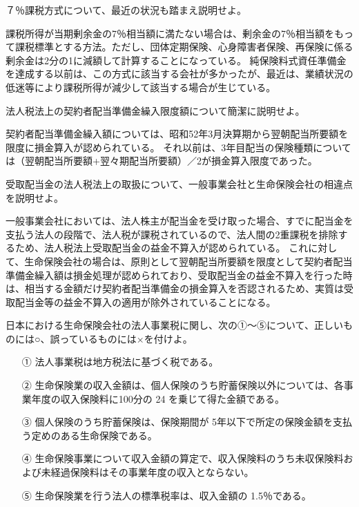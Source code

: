 \documentclass[report,gutter=10mm,fore-edge=10mm,uplatex,dvipdfmx]{jlreq}
\begin{document}
７％課税方式について、最近の状況も踏まえ説明せよ。

課税所得が当期剰余金の7％相当額に満たない場合は、剰余金の7％相当額をもって課税標準とする方法。ただし、団体定期保険、心身障害者保険、再保険に係る剰余金は2分の1に減額して計算することになっている。
純保険料式資任準備金を達成する以前は、この方式に該当する会社が多かったが、最近は、業績状況の低迷等により課税所得が減少して該当する場合が生じている。\strut


法人税法上の契約者配当準備金繰入限度額について簡潔に説明せよ。


契約者配当準備金繰入額については、昭和52年3月決算期から翌朝配当所要額を限度に損金算入が認められている。
それ以前は、3年目配当の保険種類については（翌朝配当所要額+翌々期配当所要額）／2が損金算入限度であった。



受取配当金の法人税法上の取扱について、一般事業会社と生命保険会社の相違点を説明せよ。



一般事業会社においては、法人株主が配当金を受け取った場合、すでに配当金を支払う法人の段階で、法人税が課税されているので、法人間の2重課税を排除するため、法人税法上受取配当金の益金不算入が認められている。
これに対して、生命保険会社の場合は、原則として翌朝配当所要額を限度として契約者配当準備金繰入額は損金処理が認められており、受取配当金の益金不算入を行った時は、相当する金額だけ契約者配当準備金の損金算入を否認されるため、実質は受取配当金等の益金不算入の適用が除外されていることになる。


日本における生命保険会社の法人事業税に関し、次の①～⑤について、正しいものには○、誤っているものには×を付けよ。
\begin{enumerate}
\item[①] 法人事業税は地方税法に基づく税である。
\item[②] 生命保険業の収入金額は、個人保険のうち貯蓄保険以外については、各事業年度の収入保険料に100分の 24 を乗じて得た金額である。
\item[③] 個人保険のうち貯蓄保険は、保険期間が 5年以下で所定の保険金額を支払う定めのある生命保険である。
\item[④] 生命保険事業について収入金額の算定で、収入保険料のうち未収保険料および未経過保険料はその事業年度の収入とならない。
\item[⑤] 生命保険業を行う法人の標準税率は、収入金額の 1.5％である。
\end{enumerate}
\end{document}
